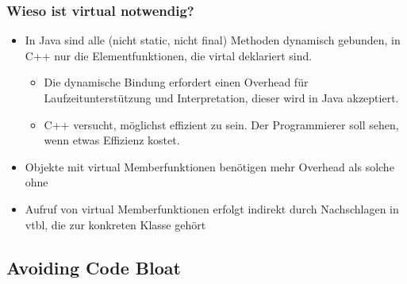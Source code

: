 \subsubsection{Wieso ist virtual notwendig?}
\begin{itemize}
  \item In Java sind alle (nicht static, nicht final) Methoden dynamisch gebunden, in C++ nur die Elementfunktionen, die virtal deklariert sind.
  \begin{itemize}
    \item Die dynamische Bindung erfordert einen Overhead für Laufzeitunterstützung und Interpretation, dieser wird in Java akzeptiert.
    \item C++ versucht, möglichst effizient zu sein. Der Programmierer soll sehen, wenn etwas Effizienz kostet.
  \end{itemize}
  \item Objekte mit virtual Memberfunktionen benötigen mehr Overhead als solche ohne
  \item Aufruf von virtual Memberfunktionen erfolgt indirekt durch Nachschlagen in vtbl, die zur konkreten Klasse gehört
\end{itemize}

\subsection{Avoiding Code Bloat}
